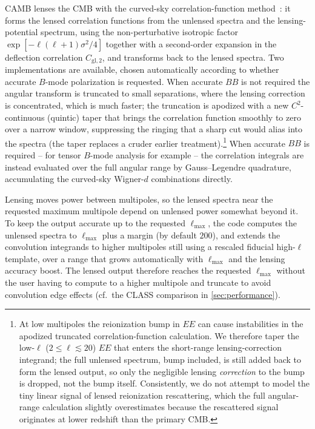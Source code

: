 \documentclass[prd, twocolumn, superscriptaddress, tightenlines, longbibliography, nofootinbib, eqsecnum, amsfonts, amsmath, floatfix, notitlepage]{revtex4-2}
\begin{document}
\textsc{CAMB} lenses the CMB with the curved-sky correlation-function
method~\cite{Challinor:2005jy,Lewis:2006fu}: it forms the lensed correlation
functions from the unlensed spectra and the lensing-potential spectrum, using the
non-perturbative isotropic factor $\exp[-\ell(\ell+1)\sigma^2/4]$ together with a
second-order expansion in the deflection correlation $C_{\mathrm{gl},2}$, and
transforms back to the lensed spectra. Two implementations are available, chosen
automatically according to whether accurate $B$-mode polarization is requested.
When accurate $BB$ is not required the angular transform is truncated to small
separations, where the lensing correction is concentrated, which is much faster;
the truncation is apodized with a new $C^2$-continuous (quintic) taper that brings
the correlation function smoothly to zero over a narrow window, suppressing the
ringing that a sharp cut would alias into the spectra (the taper replaces a cruder
earlier treatment).\footnote{At low multipoles the reionization bump in $EE$ can
cause instabilities in the apodized truncated correlation-function calculation. We
therefore taper the low-$\ell$ ($2\le\ell\lesssim20$) $EE$ that enters the short-range
lensing-correction integrand; the full unlensed spectrum, bump included, is still added
back to form the lensed output, so only the negligible lensing \emph{correction} to the
bump is dropped, not the bump itself. Consistently, we do not attempt to model the tiny
linear signal of lensed reionization rescattering, which the full angular-range
calculation slightly overestimates because the rescattered signal originates at lower
redshift than the primary CMB.} When accurate $BB$ is required -- for tensor $B$-mode analysis for
example -- the correlation integrals are instead evaluated over the full angular
range by Gauss--Legendre quadrature, accumulating the curved-sky Wigner-$d$
combinations directly.

Lensing moves power between multipoles, so the lensed spectra near the requested
maximum multipole depend on unlensed power somewhat beyond it. To keep the output
accurate up to the requested $\ell_{\max}$, the code computes the unlensed spectra
to $\ell_{\max}$ plus a margin (by default $200$), and extends the convolution
integrands to higher multipoles still using a rescaled fiducial high-$\ell$
template, over a range that grows automatically with $\ell_{\max}$ and the lensing
accuracy boost. The lensed output therefore reaches the requested $\ell_{\max}$
without the user having to compute to a higher multipole and truncate to avoid
convolution edge effects (cf.\ the \textsc{CLASS} comparison in
\cref{sec:performance}).
\end{document}
